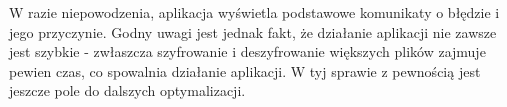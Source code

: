 \documentclass{article}
\begin{document}
	W razie niepowodzenia, aplikacja wyświetla podstawowe komunikaty o błędzie i jego przyczynie. Godny uwagi jest jednak fakt, że działanie aplikacji nie zawsze jest szybkie - zwłaszcza szyfrowanie i deszyfrowanie większych plików zajmuje pewien czas, co spowalnia działanie aplikacji. W tyj sprawie z pewnością jest jeszcze pole do dalszych optymalizacji. 
	
	
	

	
\end{document}
